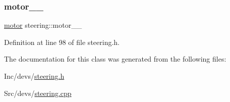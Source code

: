 \subsubsection{\texorpdfstring{motor\_\_}{motor\_\_}}
{\footnotesize\ttfamily \mbox{\hyperlink{classmotor}{motor}} steering\+::motor\+\_\+\+\_\+\hspace{0.3cm}{\ttfamily [private]}}



Definition at line 98 of file steering.\+h.



The documentation for this class was generated from the following files\+:\begin{DoxyCompactItemize}
\item 
Inc/devs/\mbox{\hyperlink{steering_8h}{steering.\+h}}\item 
Src/devs/\mbox{\hyperlink{steering_8cpp}{steering.\+cpp}}\end{DoxyCompactItemize}
